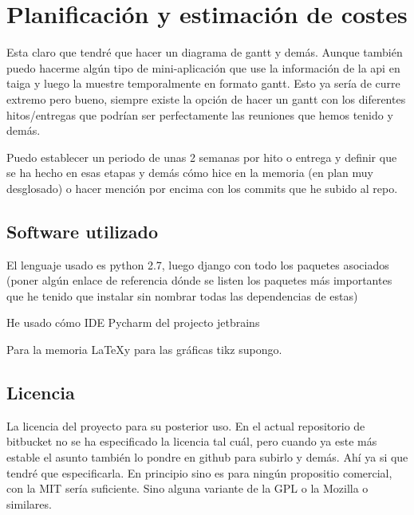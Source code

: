 \chapter{Planificación y estimación de costes}
\label{chap:planificacion}

Esta claro que tendré que hacer un diagrama de gantt y demás. Aunque también puedo hacerme algún tipo de mini-aplicación que use la información de la api en taiga y luego la muestre temporalmente en formato gantt. Esto ya sería de curre extremo pero bueno, siempre existe la opción de hacer un gantt con los diferentes hitos/entregas que podrían ser perfectamente las reuniones que hemos tenido y demás.

Puedo establecer un periodo de unas 2 semanas por hito o entrega y definir que se ha hecho en esas etapas y demás cómo hice en la memoria (en plan muy desglosado) o hacer mención por encima con los commits que he subido al repo.


\section{Software utilizado}

El lenguaje usado es python 2.7, luego django con todo los paquetes asociados (poner algún enlace de referencia dónde se listen los paquetes más importantes que he tenido que instalar sin nombrar todas las dependencias de estas)

He usado cómo IDE Pycharm del projecto jetbrains

Para la memoria \LaTeX y para las gráficas tikz supongo.

\section{Licencia}

La licencia del proyecto para su posterior uso. En el actual repositorio de bitbucket no se ha especificado la licencia tal cuál, pero cuando ya este más estable el asunto también lo pondre en github para subirlo y demás. Ahí ya si que tendré que especificarla. En principio sino es para ningún propositio comercial, con la MIT sería suficiente. Sino alguna variante de la GPL o la Mozilla o similares.


